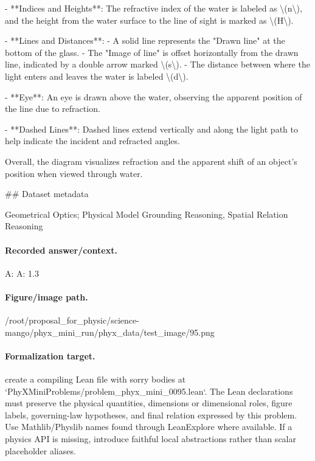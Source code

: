 - **Indices and Heights**: The refractive index of the water is labeled as \textbackslash{}(n\textbackslash{}), and the height from the water surface to the line of sight is marked as \textbackslash{}(H\textbackslash{}).

- **Lines and Distances**: 
  - A solid line represents the "Drawn line" at the bottom of the glass.
  - The "Image of line" is offset horizontally from the drawn line, indicated by a double arrow marked \textbackslash{}(s\textbackslash{}).
  - The distance between where the light enters and leaves the water is labeled \textbackslash{}(d\textbackslash{}).

- **Eye**: An eye is drawn above the water, observing the apparent position of the line due to refraction.

- **Dashed Lines**: Dashed lines extend vertically and along the light path to help indicate the incident and refracted angles.

Overall, the diagram visualizes refraction and the apparent shift of an object's position when viewed through water.

\#\# Dataset metadata

Geometrical Optics; Physical Model Grounding Reasoning, Spatial Relation Reasoning

\paragraph{Recorded answer/context.}
A: A: 1.3

\paragraph{Figure/image path.}
/root/proposal\_for\_physic/science-mango/phyx\_mini\_run/phyx\_data/test\_image/95.png

\paragraph{Formalization target.}
create a compiling Lean file with sorry bodies at `PhyXMiniProblems/problem\_phyx\_mini\_0095.lean`. The Lean declarations must preserve the physical quantities, dimensions or dimensional roles, figure labels, governing-law hypotheses, and final relation expressed by this problem.
Use Mathlib/Physlib names found through LeanExplore where available. If a physics API is missing, introduce faithful local abstractions rather than scalar placeholder aliases.


